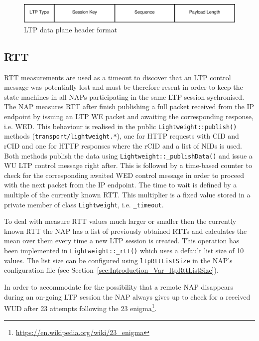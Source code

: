 \documentclass[a4paper,11pt,titlepage]{report}
\begin{document}
\begin{figure}[ht]
	\begin{center}
		\includegraphics[width=1\textwidth]{eps/ltpPacketFormat-data.eps}
		\caption{\acl{LTP} data plane header format}
		\label{fig:LTPPacketFormat-Data}
	\end{center}
\end{figure}

\subsection{\acl{RTT}}\label{sec:Transport_LTP_RTT}
\ac{RTT} measurements are used as a timeout to discover that an \ac{LTP} control message was potentially lost and must be therefore resent in order to keep the state machines in all \acp{NAP} participating in the same \ac{LTP} session sychronised. The \ac{NAP} measures \ac{RTT} after finish publishing a full packet received from the IP endpoint by issuing an \ac{LTP} \ac{WE} packet and awaiting the corresponding response, i.e. \ac{WED}. This behaviour is realised in the public \texttt{Lightweight::publish()} methods (\texttt{transport/lightweight.*}), one for \ac{HTTP} requests with \ac{CID} and \ac{rCID} and one for \ac{HTTP} responses where the \ac{rCID} and a list of \acp{NID} is used. Both methods publish the data using \texttt{Lightweight::\_publishData()} and issue a \ac{WU} \ac{LTP} control message right after. This is followed by a time-based counter to check for the corresponding awaited \ac{WED} control message in order to proceed with the next packet from the IP endpoint. The time to wait is defined by a multiple of the currently known \ac{RTT}. This multiplier is a fixed value stored in a private member of class \texttt{Lightweight}, i.e. \texttt{\_timeout}.

To deal with measure \ac{RTT} values much larger or smaller then the currently known \ac{RTT} the \ac{NAP} has a list of previously obtained \acp{RTT} and calculates the mean over them every time a new \ac{LTP} session is created. This operation has been implemented in \texttt{Lightweight::\_rtt()} which uses a default list size of 10 values. The list size can be configured using \texttt{ltpRttListSize} in the \ac{NAP}'s configuration file (see Section~\ref{sec:Introduction_Var_ltpRttListSize}).

In order to accommodate for the possibility that a remote \ac{NAP} disappears during an on-going \ac{LTP} session the \ac{NAP} always gives up to check for a received \ac{WUD} after 23 attempts following the 23 enigma\footnote{\url{https://en.wikipedia.org/wiki/23_enigma}}.
\end{document}

